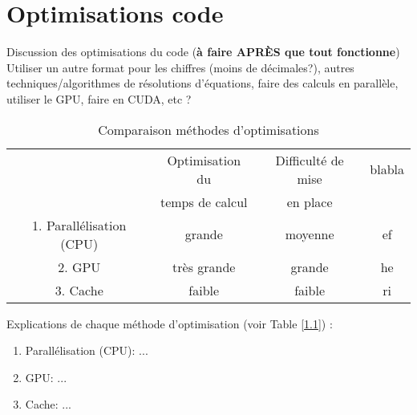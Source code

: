 \chapter{Optimisations code}
\label{chaper-5}

Discussion des optimisations du code (\textbf{à faire APRÈS que tout fonctionne})\\

Utiliser un autre format pour les chiffres (moins de décimales?), autres techniques/algorithmes de résolutions d'équations, faire des calculs en parallèle, utiliser le GPU, faire en CUDA, etc ?\\

\begin{table}[h]
    \centering
    \begin{tabular}{|c|c|c|c|}
        \hline
         & Optimisation du & Difficulté de mise & blabla\\
         & temps de calcul & en place & \\
         \hline
         1. Parallélisation (CPU) & grande & moyenne & ef\\
         2. GPU & très grande & grande & he\\
         3. Cache & faible & faible & ri\\
         \hline
    \end{tabular}
    \caption{Comparaison méthodes d'optimisations}
    \label{tab:optimisation-table}
\end{table}

Explications de chaque méthode d'optimisation (voir Table [\ref{tab:optimisation-table}]) :
\begin{enumerate}
    \item Parallélisation (CPU): ...
    \item GPU: ...
    \item Cache: ...
\end{enumerate}
